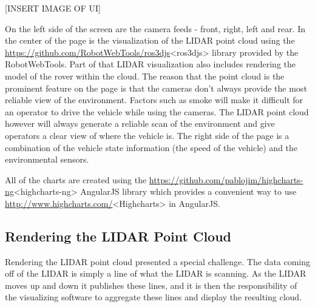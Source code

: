 [INSERT IMAGE OF UI]

On the left side of the screen are the camera feeds - front, right, left and rear.  In the center of the page is the visualization of the LIDAR point cloud using the \url{https://github.com/RobotWebTools/ros3djs}<ros3djs> library provided by the RobotWebTools.  Part of that LIDAR visualization also includes rendering the model of the rover within the cloud.  The reason that the point cloud is the prominent feature on the page is that the cameras don't always provide the most reliable view of the environment.  Factors such as smoke will make it difficult for an operator to drive the vehicle while using the cameras.  The LIDAR point cloud however will always generate a reliable scan of the environment and give operators a clear view of where the vehicle is.  The right side of the page is a combination of the vehicle state information (the speed of the vehicle) and the environmental sensors.

All of the charts are created using the \url{https://github.com/pablojim/highcharts-ng}<highcharts-ng> AngularJS library which provides a convenient way to use \url{http://www.highcharts.com/}<Highcharts> in AngularJS.

\subsection{Rendering the LIDAR Point Cloud}
Rendering the LIDAR point cloud presented a special challenge.  The data coming off of the LIDAR is simply a line of what the LIDAR is scanning.  As the LIDAR moves up and down it publishes these lines, and it is then the responsibility of the visualizing software to aggregate these lines and display the resulting cloud.

